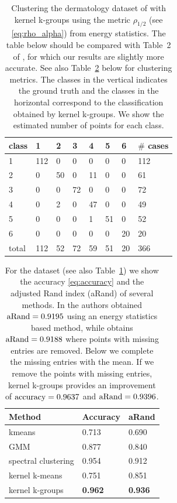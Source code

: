 \documentclass[10pt,journal,compsoc]{IEEEtran}
\begin{document}
\begin{table}[t]
\caption{
\label{tb:dermatology}
Clustering the dermatology 
dataset of \cite{Dua2017,Guvenir1998} with kernel k-groups
using the metric $\rho_{1/2}$ (see \eqref{eq:rho_alpha}) from energy
statistics. The table below should be compared with Table~2 of
\cite{RizzoClustering}, for which our results are slightly more accurate.
See also Table~\ref{tb:dermatology_accuracy} below for clustering metrics.
The classes in the vertical indicates the ground truth and the classes
in the horizontal correspond to the classification
obtained by kernel k-groups. We show the estimated number of points
for each class.
}
\centering
\begin{tabular}{@{}l|llllll|l@{}}
class & 1 & 2 & 3 & 4 & 5 & 6 & $\#$ cases \\ \midrule[.5pt]
   1   & 112 & 0  & 0  & 0  & 0  & 0  &  112  \\
   2   &  0  & 50 & 0  & 11 & 0  & 0  &   61  \\
   3   &  0  & 0  & 72 & 0  & 0  & 0  &   72  \\
   4   &  0  & 2  & 0  & 47 & 0  & 0  &   49  \\
   5   &  0  & 0  & 0  & 1  & 51 & 0  &   52  \\
   6   &  0  & 0  & 0  & 0  & 0  & 20 &   20  \\ \midrule[.5pt]
total & 112 & 52 & 72 & 59 & 51 & 20 &  366 %
\end{tabular}
\end{table}

\begin{table}[t]
\caption{
\label{tb:dermatology_accuracy}
For the dataset \cite{Dua2017,Guvenir1998} (see also
Table~\ref{tb:dermatology}) we show the accuracy \eqref{eq:accuracy} and
the adjusted Rand index (aRand) of several methods.
In \cite{RizzoClustering} the authors 
obtained $\textnormal{aRand}=0.9195$ using an energy statistics
based method, while \cite{Kgroups} obtains $\textnormal{aRand}=0.9188$ 
where points with missing
entries are removed. Below we complete the missing entries with the mean.
If we remove the points with missing entries, kernel k-groups provides an
improvement of $\textnormal{accuracy}=0.9637$ and $\textnormal{aRand}=0.9396$.
}
\centering
\begin{tabular}{@{}l|ll@{}}
       Method      & Accuracy & aRand \\ \midrule[.5pt]
        kmeans       & 0.713 & 0.690 \\
         GMM         & 0.877 & 0.840 \\
 spectral clustering & 0.954 & 0.912 \\
    kernel k-means   & 0.751 & 0.851 \\
   kernel k-groups   & \textbf{0.962} & \textbf{0.936}
\end{tabular}
\end{table}
\end{document}
